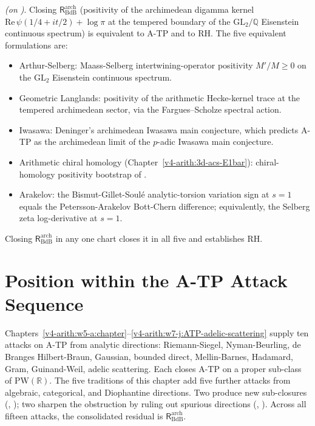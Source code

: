 \begin{proposition}
\label{v4-arith:w8-atp:prop:consolidated}
\ClaimStatusProvedHereConditional \emph{(on
)}. Closing
\(\mathsf{R}^{\mathrm{arch}}_{\mathrm{BdB}}\) (positivity of the
archimedean digamma kernel
\(\mathrm{Re}\,\psi(1/4+it/2)+\log\pi\) at the tempered boundary of
the \(\mathrm{GL}_2/\mathbb{Q}\) Eisenstein continuous spectrum) is
equivalent to A-TP and to RH. The five equivalent formulations are:
\begin{itemize}
\item Arthur-Selberg: Maass-Selberg intertwining-operator positivity
\(M'/M\geq 0\) on the \(\mathrm{GL}_2\) Eisenstein continuous spectrum.
\item Geometric Langlands: positivity of the arithmetic Hecke-kernel
trace at the tempered archimedean sector, via the Fargues--Scholze
spectral action.
\item Iwasawa: Deninger's archimedean Iwasawa main conjecture, which
predicts A-TP as the archimedean limit of the \(p\)-adic Iwasawa
main conjecture.
\item Arithmetic chiral homology (Chapter~\ref{v4-arith:3d-acs-E1bar}):
chiral-homology positivity bootstrap of
.
\item Arakelov: the Bismut-Gillet-Soul\'{e} analytic-torsion variation
sign at \(s=1\) equals the Petersson-Arakelov Bott-Chern difference;
equivalently, the Selberg zeta log-derivative at \(s=1\).
\end{itemize}
Closing \(\mathsf{R}^{\mathrm{arch}}_{\mathrm{BdB}}\) in any one
chart closes it in all five and establishes RH.
\end{proposition}

\section{Position within the A-TP Attack Sequence}
\label{v4-arith:w8-atp:relations}

Chapters~\ref{v4-arith:w5-a:chapter}--\ref{v4-arith:w7-j:ATP-adelic-scattering}
supply ten attacks on A-TP from analytic directions: Riemann-Siegel,
Nyman-Beurling, de Branges Hilbert-Braun, Gaussian, bounded direct,
Mellin-Barnes, Hadamard, Gram, Guinand-Weil, adelic scattering. Each
closes A-TP on a proper sub-class of \(\mathrm{PW}(\mathbb{R})\). The
five traditions of this chapter add five further attacks from algebraic,
categorical, and Diophantine directions. Two produce new sub-closures
(,
); two sharpen the
obstruction by ruling out spurious directions
(,
). Across all fifteen
attacks, the consolidated residual is
\(\mathsf{R}^{\mathrm{arch}}_{\mathrm{BdB}}\).


